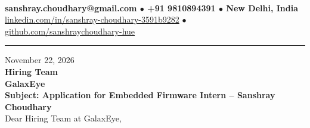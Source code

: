 \documentclass[10pt,a4paper]{article}%
\begin{document}
%
 \vspace{3pt}\\%
\noindent \textbf{\footnotesize sanshray.choudhary@gmail.com $\bullet$ +91 9810894391 $\bullet$ New Delhi, India}\\%
\noindent \href{https://www.linkedin.com/in/sanshray-choudhary-3591b9282}{linkedin.com/in/sanshray-choudhary-3591b9282} $\bullet$ \href{https://github.com/sanshraychoudhary-hue}{github.com/sanshraychoudhary-hue} \vspace{12pt}%
\hrule \vspace{18pt}%

\noindent November 22, 2026 \vspace{12pt}\\%
\noindent \textbf{Hiring Team} \\%
\noindent \textbf{GalaxEye} \vspace{16pt}\\%

\noindent \textbf{Subject: Application for Embedded Firmware Intern -- Sanshray Choudhary} \vspace{12pt}\\%

\noindent Dear Hiring Team at GalaxEye, \vspace{8pt}\\%
\end{document}
